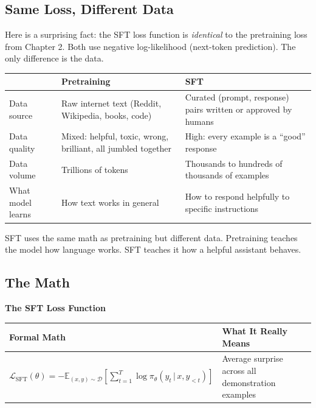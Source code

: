 \begin{chapterenv}
\subsection{Same Loss, Different Data}

Here is a surprising fact: the SFT loss function is \textit{identical} to the pretraining loss from Chapter 2. Both use negative log-likelihood (next-token prediction). The only difference is the data.

\begin{center}
\begin{tabular}{p{}p{}p{}}
\toprule
& \textbf{Pretraining} & \textbf{SFT} \\
\midrule
Data source & Raw internet text (Reddit, Wikipedia, books, code) & Curated (prompt, response) pairs written or approved by humans \\
Data quality & Mixed: helpful, toxic, wrong, brilliant, all jumbled together & High: every example is a ``good'' response \\
Data volume & Trillions of tokens & Thousands to hundreds of thousands of examples \\
What model learns & How text works in general & How to respond helpfully to specific instructions \\
\bottomrule
\end{tabular}
\end{center}

\begin{tipbox}
SFT uses the same math as pretraining but different data. Pretraining teaches the model how language works. SFT teaches it how a helpful assistant behaves.
\end{tipbox}

\subsection{The Math}

\begin{infobox}
\textbf{The SFT Loss Function}

\begin{center}
\begin{tabular}{p{}p{}}
\toprule
\textbf{Formal Math} & \textbf{What It Really Means} \\
\midrule
$\mathcal{L}_{\text{SFT}}(\theta) = -\mathbb{E}_{(x,y) \sim \mathcal{D}}\!\left[\sum_{t=1}^T \log \pi_\theta(y_t \,|\, x, y_{<t})\right]$ & Average surprise across all demonstration examples \\
\bottomrule
\end{tabular}
\end{center}


\end{infobox}
\end{chapterenv}

